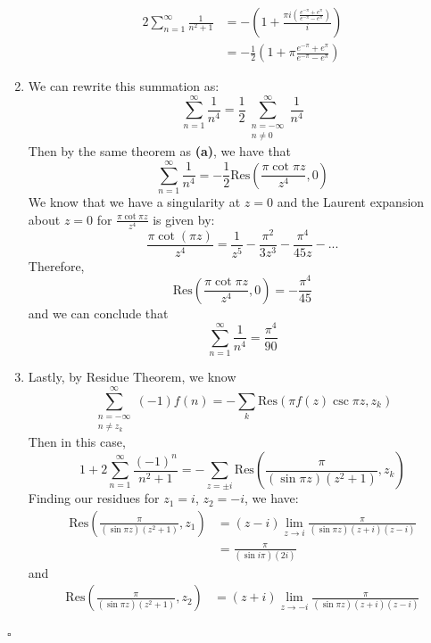 \documentclass[11pt]{article}
\newenvironment{proof}{\noindent{\bf Proof.}}{\hfill $\square$\medskip}
\begin{document}
\begin{proof}
\begin{enumerate}[label=\textbf{(\alph*)}]
\begin{equation}
                    \begin{split}
                        2\sum_{n=1}^{\infty}\frac{1}{n^{2}+1}&=-\left(1+\frac{\pi i\left(\frac{e^{-\pi}+e^{\pi}}{e^{-\pi}-e^{\pi}}\right)}{i}\right)\\
                        &=-\frac{1}{2}\left(1+\pi\frac{e^{-\pi}+e^{\pi}}{e^{-\pi}-e^{\pi}}\right)
                    \end{split}
                \end{equation}
        \item We can rewrite this summation as:
        $$\sum_{n=1}^{\infty}\frac{1}{n^{4}}=\frac{1}{2}\sum_{\substack{n=-\infty\\n\neq0}}^{\infty}\frac{1}{n^{4}}$$
        Then by the same theorem as \textbf{(a)}, we have that
        $$\sum_{n=1}^{\infty}\frac{1}{n^{4}}=-\frac{1}{2}\text{Res}\left(\frac{\pi\cot\pi z}{z^{4}},0\right)$$
        We know that we have a singularity at $z=0$ and the Laurent expansion about $z=0$ for $\frac{\pi\cot\pi z}{z^{4}}$ is given by:
        $$\frac{\pi\cot(\pi z)}{z^{4}}=\frac{1}{z^{5}}-\frac{\pi^{2}}{3z^{3}}-\frac{\pi^{4}}{45z}-...$$
        Therefore,
        $$\text{Res}\left(\frac{\pi\cot\pi z}{z^{4}},0\right)=-\frac{\pi^{4}}{45}$$
        and we can conclude that 
        $$\sum_{n=1}^{\infty}\frac{1}{n^{4}}=\frac{\pi^{4}}{90}$$
        \item Lastly, by Residue Theorem, we know
        $$\sum_{\substack{n=-\infty\\n\neq z_{k}}}^{\infty}(-1)f(n)=-\sum_{k}\text{Res}(\pi f(z)\csc\pi z, z_{k})$$
        Then in this case,
        $$1+2\sum_{n=1}^{\infty}\frac{(-1)^{n}}{n^{2}+1}=-\sum_{z=\pm i}\text{Res}\left(\frac{\pi}{(\sin\pi z)(z^{2}+1)},z_{k}\right)$$
        Finding our residues for $z_{1}=i$, $z_{2}=-i$, we have:
        \begin{equation}
            \begin{split}
                \text{Res}\left(\frac{\pi}{(\sin\pi z)(z^{2}+1)},z_{1}\right)&=(z-i)\lim_{z\to i}\frac{\pi}{(\sin\pi z)(z+i)(z-i)}\\
                &=\frac{\pi}{(\sin i\pi)(2i)}
            \end{split}
        \end{equation}
        and
        \begin{equation}
            \begin{split}
                \text{Res}\left(\frac{\pi}{(\sin\pi z)(z^{2}+1)},z_{2}\right)&=(z+i)\lim_{z\to-i}\frac{\pi}{(\sin\pi z)(z+i)(z-i)}\\

\end{split}
\end{equation}
\end{enumerate}
\end{proof}
\end{document}
